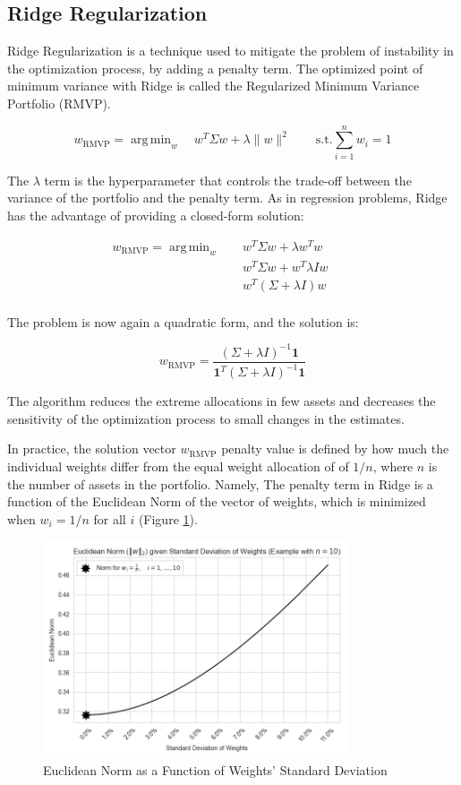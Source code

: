 \documentclass{article}
\DeclareMathOperator*{\argmin}{arg\,min}
\begin{document}
\FloatBarrier
\subsection{Ridge Regularization}
Ridge Regularization is a technique used to mitigate the problem of instability in the optimization process, by adding a penalty term. The optimized point of minimum variance with Ridge is called the Regularized Minimum Variance Portfolio (RMVP).

$$
w_{\text{RMVP}} = \argmin_{w} \quad w^{T} \Sigma w + \lambda \|w\|^{2} \quad \quad
\text{s.t.} \sum_{i=1}^{n} w_{i} = 1
$$

The $\lambda$ term is the hyperparameter that controls the trade-off between the variance of the portfolio and the penalty term. As in regression problems, Ridge has the advantage of providing a closed-form solution:

\begin{align*}
w_{\text{RMVP}} = \argmin_{w} & \quad w^{T} \Sigma w + \lambda w^T w \quad \quad \\
                & \quad w^{T} \Sigma w + w^T \lambda I w \quad \quad \\
                & \quad w^{T} (\Sigma + \lambda I) w \quad \quad \\
\end{align*}

The problem is now again a quadratic form, and the solution is:

$$
w_{\text{RMVP}} = \frac{(\Sigma + \lambda I)^{-1} \mathbf{1}}{\mathbf{1}^{T} (\Sigma + \lambda I)^{-1} \mathbf{1}}
$$

The algorithm reduces the extreme allocations in few assets and decreases the sensitivity of the optimization process to small changes in the estimates.

In practice, the solution vector $w_{\text{RMVP}}$ penalty value is defined by how much the individual weights differ from the equal weight allocation of of $1/n$, where $n$ is the number of assets in the portfolio. Namely, The penalty term in Ridge is a function of the Euclidean Norm of the vector of weights, which is minimized when $w_i = 1/n$ for all $i$ (Figure \ref{fig:euclidean_norm}).

\begin{figure}[h]
    \centering
    \includegraphics[width=0.8\textwidth]{graphics/illustrations/euclidean_norm.png}
    \caption{Euclidean Norm as a Function of Weights' Standard Deviation}
    \label{fig:euclidean_norm}
\end{figure}
\end{document}
